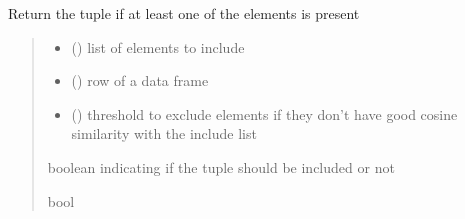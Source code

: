 \documentclass[letterpaper,10pt,english]{sphinxmanual}
\begin{document}
\begin{fulllineitems}
\label{\detokenize{auxilary_functions:auxilary_functions.include_tuple}}
\pysigstartsignatures
{}
\pysigstopsignatures
\sphinxAtStartPar
Return the tuple if at least one of the elements is present
\begin{quote}\begin{description}
\begin{itemize}
\item {} 
\sphinxAtStartPar
{} () \textendash{} list of elements to include

\item {} 
\sphinxAtStartPar
{} () \textendash{} row of a data frame

\item {} 
\sphinxAtStartPar
{} () \textendash{} threshold to exclude elements if they don’t have good cosine similarity with the include list

\end{itemize}

\sphinxAtStartPar
boolean indicating if the tuple should be included or not

\sphinxAtStartPar
bool

\end{description}\end{quote}

\end{fulllineitems}

\end{document}
